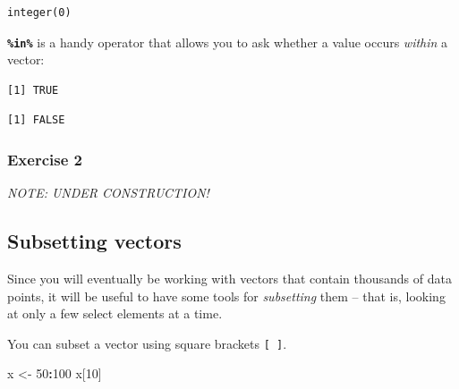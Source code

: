 \documentclass[
]{book}
\newenvironment{Shaded}{\begin{snugshade}}{\end{snugshade}}
\newcommand{\DecValTok}[1]{\textcolor[rgb]{0.00,0.00,0.81}{#1}}
\newcommand{\NormalTok}[1]{#1}
\newcommand{\OperatorTok}[1]{\textcolor[rgb]{0.81,0.36,0.00}{\textbf{#1}}}
\newcommand{\StringTok}[1]{\textcolor[rgb]{0.31,0.60,0.02}{#1}}
\begin{document}
\begin{verbatim}
integer(0)
\end{verbatim}

\textbf{\texttt{\%in\%}} is a handy operator that allows you to ask whether a value occurs \emph{within} a vector:

\begin{Shaded}
\end{Shaded}

\begin{verbatim}
[1] TRUE
\end{verbatim}

\begin{Shaded}
\end{Shaded}

\begin{verbatim}
[1] FALSE
\end{verbatim}

\hypertarget{exercise-2-1}{%
\subsubsection*{Exercise 2}\label{exercise-2-1}}

\emph{NOTE: UNDER CONSTRUCTION!}

\hypertarget{subsetting-vectors}{%
\subsection*{Subsetting vectors}\label{subsetting-vectors}}

Since you will eventually be working with vectors that contain thousands of data points, it will be useful to have some tools for \emph{subsetting} them -- that is, looking at only a few select elements at a time.

You can subset a vector using square brackets \texttt{{[}\ {]}}.

\begin{Shaded}
\begin{Highlighting}[]
\NormalTok{x <-}\StringTok{ }\DecValTok{50}\OperatorTok{:}\DecValTok{100}
\NormalTok{x[}\DecValTok{10}\NormalTok{]}
\end{Highlighting}
\end{Shaded}
\end{document}
